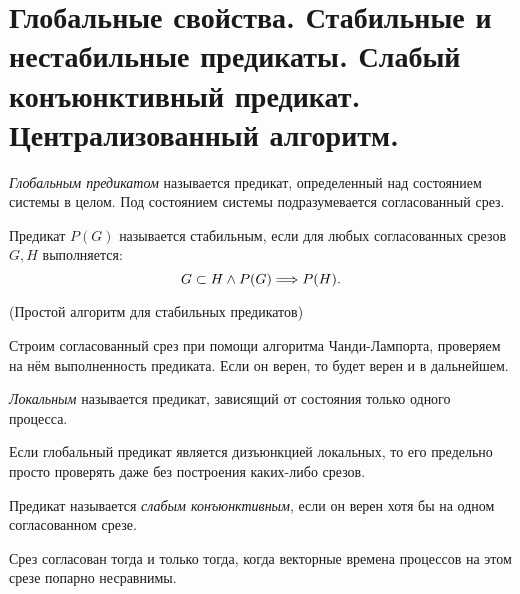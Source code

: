 \section{Глобальные свойства. Стабильные и нестабильные предикаты.
Слабый конъюнктивный предикат. Централизованный алгоритм.}

\begin{definition}
    \textit{Глобальным предикатом} называется предикат, определенный
    над состоянием системы в целом. Под состоянием системы подразумевается
    согласованный срез.
\end{definition}

\begin{definition}
    Предикат $P(G)$ называется стабильным, если для любых согласованных
    срезов $G, H$ выполняется:
    \[
        G \subset H \wedge P(G) \Longrightarrow P(H)
    .\]
\end{definition}

\begin{algorithm}(Простой алгоритм для стабильных предикатов)

    Строим согласованный срез при помощи алгоритма Чанди-Лампорта,
    проверяем на нём выполненность предиката. Если он верен, то будет
    верен и в дальнейшем.
\end{algorithm}

\begin{definition}
    \textit{Локальным} называется предикат, зависящий от состояния
    только одного процесса.
\end{definition}

\begin{remark}
    Если глобальный предикат является дизъюнкцией локальных, то его
    предельно просто проверять даже без построения каких-либо срезов.
\end{remark}

\begin{definition}
    Предикат называется \textit{слабым конъюнктивным}, если он верен хотя бы
    на одном согласованном срезе.
\end{definition}

\begin{theorem}
    Срез согласован тогда и только тогда, когда векторные времена процессов
    на этом срезе попарно несравнимы.
\end{theorem}

